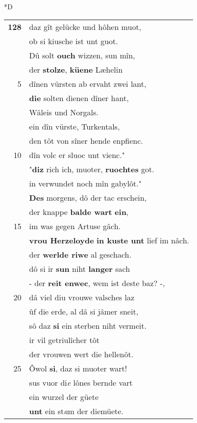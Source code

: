 \documentclass[8pt,a4paper,notitlepage]{article}
\begin{document}
\begin{table}[ht]
\begin{minipage}[t]{0.5\linewidth}
\small
\begin{center}*D
\end{center}
\begin{tabular}{rl}
\textbf{128} & daz gît gelücke und hôhen muot,\\ 
 & ob si kiusche ist unt guot.\\ 
 & Dû solt \textbf{ouch} wizzen, sun mîn,\\ 
 & der \textbf{stolze}, \textbf{küene} Læhelin\\ 
5 & dînen vürsten ab ervaht zwei lant,\\ 
 & \textbf{die} solten dienen dîner hant,\\ 
 & Wâleis und Norgals.\\ 
 & ein dîn vürste, Turkentals,\\ 
 & den tôt von sîner hende enpfienc.\\ 
10 & dîn volc er sluoc unt vienc."\\ 
 & "\textbf{diz} rich ich, muoter, \textbf{ruochte}\textbf{s} got.\\ 
 & in verwundet noch mîn gabylôt."\\ 
 & \textbf{Des} morgens, dô der tac erschein,\\ 
 & der knappe \textbf{balde wart} \textbf{ein},\\ 
15 & im was gegen Artuse gâch.\\ 
 & \textbf{vrou Herzeloyde} \textbf{in kuste unt} lief im nâch.\\ 
 & der \textbf{werlde riwe} al geschach.\\ 
 & dô si ir \textbf{sun} niht \textbf{langer} sach\\ 
 & - der \textbf{reit enwec}, wem ist deste baz? -,\\ 
20 & dâ viel diu vrouwe valsches laz\\ 
 & ûf die erde, al dâ si jâmer sneit,\\ 
 & sô daz \textbf{si} ein sterben niht vermeit.\\ 
 & ir vil getriulîcher tôt\\ 
 & der vrouwen wert die hellenôt.\\ 
25 & Ôwol \textbf{si}, daz si muoter wart!\\ 
 & sus vuor di\textit{e} lônes bernde vart\\ 
 & ein wurzel der güete\\ 
 & \textbf{unt} ein st\textit{a}m der diemüete.\\ 

\end{tabular}
\end{minipage}
\end{table}
\end{document}
